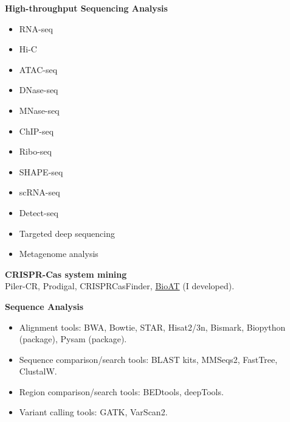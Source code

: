\textbf{High-throughput Sequencing Analysis}
\vspace{-1em}
\begin{multicols}{3} %
\begin{itemize}
    \item RNA-seq
    \item Hi-C
    \item ATAC-seq
    \item DNase-seq
\end{itemize}  
  
\columnbreak %
  
\begin{itemize}  
    \item MNase-seq
    \item ChIP-seq
    \item Ribo-seq
    \item SHAPE-seq
\end{itemize}  
  
\columnbreak %
  
\begin{itemize}  
    \item scRNA-seq
    \item Detect-seq
    \item Targeted deep sequencing
    \item Metagenome analysis
\end{itemize}
\end{multicols}
\vspace{-1em}

\textbf{CRISPR-Cas system mining}\\
Piler-CR, Prodigal, CRISPRCasFinder, \href{https://github.com/hermanzhaozzzz/bioat}{BioAT} (I developed).


\textbf{Sequence Analysis}
\begin{itemize}
    \item Alignment tools: BWA, Bowtie, STAR, Hisat2/3n, Bismark, Biopython (package), Pysam (package).
    \item Sequence comparison/search tools: BLAST kits, MMSeqs2, FastTree, ClustalW.
    \item Region comparison/search tools: BEDtools, deepTools.
    \item Variant calling tools: GATK, VarScan2.
\end{itemize}

